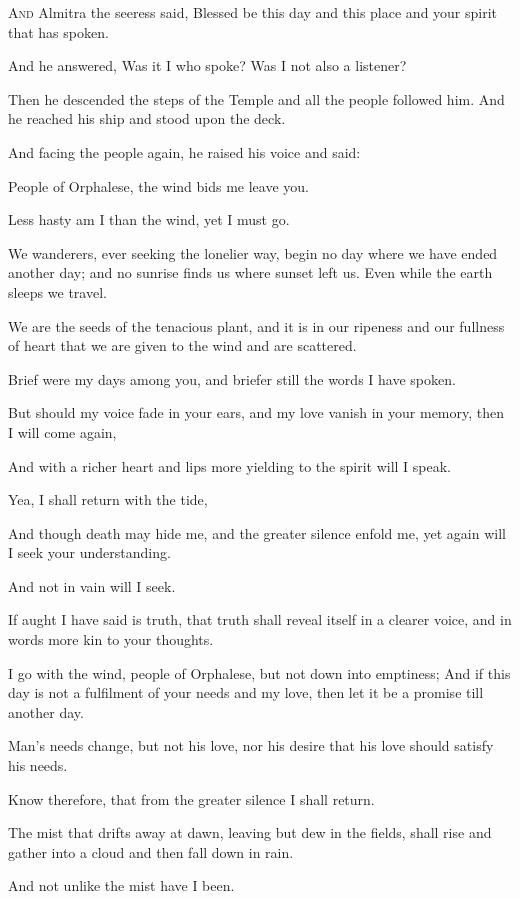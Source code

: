 \lettrine{A}{nd} Almitra the seeress said, Blessed be
this day and this place and your spirit
that has spoken.

\medskip
And he answered, Was it I who spoke? Was
I not also a listener?

Then he descended the steps of the
Temple and all the people followed him.
And he reached his ship and stood upon
the deck.

And facing the people again, he raised
his voice and said:

People of Orphalese, the wind bids me
leave you.

Less hasty am I than the wind, yet I
must go.

We wanderers, ever seeking the lonelier
way, begin no day where we have ended
another day; and no sunrise finds us
where sunset left us. Even while the
earth sleeps we travel.

We are the seeds of the tenacious
plant, and it is in our ripeness and our
fullness of heart that we are given to
the wind and are scattered.


Brief were my days among you, and
briefer still the words I have spoken.

But should my voice fade in your ears,
and my love vanish in your memory, then
I will come again,

And with a richer heart and lips more
yielding to the spirit will I speak.

Yea, I shall return with the tide,

And though death may hide me, and the
greater silence enfold me, yet again
will I seek your understanding.

And not in vain will I seek.

If aught I have said is truth, that
truth shall reveal itself in a clearer
voice, and in words more kin to your
thoughts.

I go with the wind, people of
Orphalese, but not down into emptiness;
And if this day is not a fulfilment
of your needs and my love, then let it
be a promise till another day.

Man’s needs change, but not his love,
nor his desire that his love should
satisfy his needs.

Know therefore, that from the greater
silence I shall return.

The mist that drifts away at dawn,
leaving but dew in the fields, shall
rise and gather into a cloud and then
fall down in rain.

And not unlike the mist have I been.

